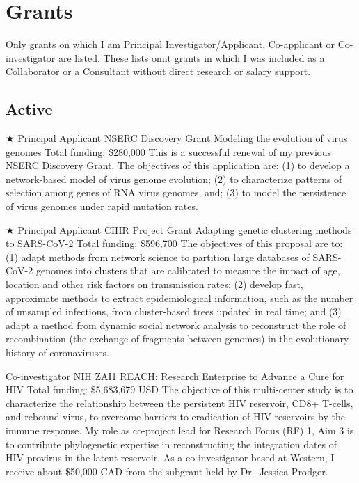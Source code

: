 
\section{Grants}

Only grants on which I am Principal Investigator/Applicant, Co-applicant or Co-investigator are listed.
These lists omit grants in which I was included as a Collaborator or a Consultant without direct research or salary support.


\subsection {Active}

{$\bigstar$ Principal Applicant}
{NSERC Discovery Grant}
{Modeling the evolution of virus genomes}
{Total funding: \$280,000}
{
This is a successful renewal of my previous NSERC Discovery Grant. 
The objectives of this application are: 
(1) to develop a network-based model of virus genome evolution;
(2) to characterize patterns of selection among genes of RNA virus genomes, and;
(3) to model the persistence of virus genomes under rapid mutation rates.\\
}


{$\bigstar$ Principal Applicant}
{CIHR Project Grant}
{Adapting genetic clustering methods to SARS-CoV-2}
{Total funding: \$596,700} %
{
The objectives of this proposal are to: (1) adapt methods from network science to partition large databases of SARS-CoV-2 genomes into clusters that are calibrated to measure the impact of age, location and other risk factors on transmission rates; (2) develop fast, approximate methods to extract epidemiological information, such as the number of unsampled infections, from cluster-based trees updated in real time; and (3) adapt a method from dynamic social network analysis to reconstruct the role of recombination (the exchange of fragments between genomes) in the evolutionary history of coronaviruses.\\
}


{Co-investigator}
{NIH ZAI1}  %
{REACH: Research Enterprise to Advance a Cure for HIV}
{Total funding: \$5,683,679 USD}
{
The objective of this multi-center study is to characterize the relationship between the persistent HIV reservoir, CD8+ T-cells, and rebound virus, to overcome barriers to eradication of HIV reservoirs by the immune response. 
My role as co-project lead for Research Focus (RF) 1, Aim 3 is to contribute phylogenetic expertise in reconstructing the integration dates of HIV provirus in the latent reservoir. 
As a co-investigator based at Western, I receive about \$50,000 CAD from the subgrant held by Dr.~Jessica Prodger.
}


